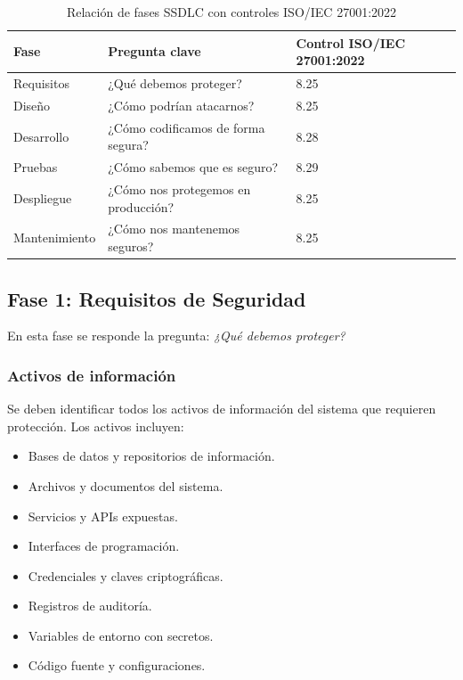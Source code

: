 \begin{table}[h]
\centering
\small
\begin{tabular}{|l|l|l|}
\hline
\textbf{Fase} & \textbf{Pregunta clave} & \textbf{Control ISO/IEC 27001:2022} \\
\hline
Requisitos & ¿Qué debemos proteger? & 8.25 \\
Diseño & ¿Cómo podrían atacarnos? & 8.25 \\
Desarrollo & ¿Cómo codificamos de forma segura? & 8.28 \\
Pruebas & ¿Cómo sabemos que es seguro? & 8.29 \\
Despliegue & ¿Cómo nos protegemos en producción? & 8.25 \\
Mantenimiento & ¿Cómo nos mantenemos seguros? & 8.25 \\
\hline
\end{tabular}
\caption{Relación de fases SSDLC con controles ISO/IEC 27001:2022}
\label{tab:ssdlc-fases}
\end{table}

\subsection{Fase 1: Requisitos de Seguridad}

En esta fase se responde la pregunta: \textit{¿Qué debemos proteger?}

\subsubsection{Activos de información}

Se deben identificar todos los activos de información del sistema que requieren protección. Los activos incluyen:

\begin{itemize}
    \item Bases de datos y repositorios de información.
    \item Archivos y documentos del sistema.
    \item Servicios y APIs expuestas.
    \item Interfaces de programación.
    \item Credenciales y claves criptográficas.
    \item Registros de auditoría.
    \item Variables de entorno con secretos.
    \item Código fuente y configuraciones.
\end{itemize}

